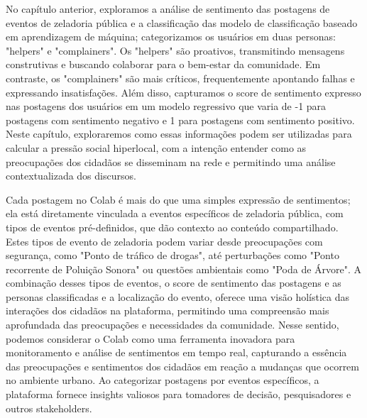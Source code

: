 No capítulo anterior, exploramos a análise de sentimento das postagens de eventos de zeladoria pública e a classificação das modelo de classificação baseado em aprendizagem de máquina; categorizamos os usuários em duas personas: "helpers" e "complainers". Os "helpers" são proativos, transmitindo mensagens construtivas e buscando colaborar para o bem-estar da comunidade. Em contraste, os "complainers" são mais críticos, frequentemente apontando falhas e expressando insatisfações. Além disso, capturamos o score de sentimento expresso nas postagens dos usuários em um modelo regressivo que varia de -1 para postagens com sentimento negativo e 1 para postagens com sentimento positivo. Neste capítulo, exploraremos como essas informações podem ser utilizadas para calcular a pressão social hiperlocal, com a intenção entender como as preocupações dos cidadãos se disseminam na rede e permitindo uma análise contextualizada dos discursos.

Cada postagem no Colab é mais do que uma simples expressão de sentimentos; ela está diretamente vinculada a eventos específicos de zeladoria pública, com tipos de eventos pré-definidos, que dão contexto ao conteúdo compartilhado. Estes tipos de evento de zeladoria podem variar desde preocupações com segurança, como "Ponto de tráfico de drogas", até perturbações como "Ponto recorrente de Poluição Sonora" ou questões ambientais como "Poda de Árvore". A combinação desses tipos de eventos, o score de sentimento das postagens e as personas classificadas e a localização do evento, oferece uma visão holística das interações dos cidadãos na plataforma, permitindo uma compreensão mais aprofundada das preocupações e necessidades da comunidade. Nesse sentido, podemos considerar o Colab como uma ferramenta inovadora para monitoramento e análise de sentimentos em tempo real, capturando a essência das preocupações e sentimentos dos cidadãos em reação a mudanças que ocorrem no ambiente urbano. Ao categorizar postagens por eventos específicos, a plataforma fornece insights valiosos para tomadores de decisão, pesquisadores e outros stakeholders. 

